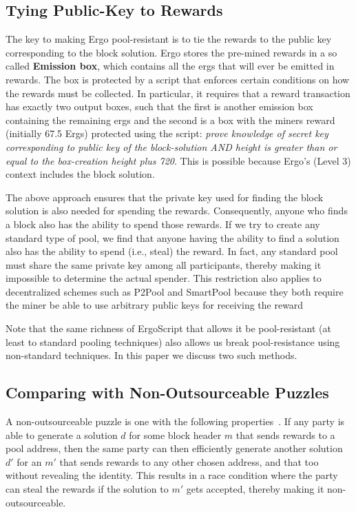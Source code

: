 \documentclass[11pt]{article}
\newcommand{\authnote}[2]{\marginpar{\parbox{\marginparwidth}{\tiny %
  \textsf{#1 {\textcolor{blue}{notes: #2}}}}}%
  \textcolor{blue}{\textbf{\dag}}}
\newcommand{\authnote}[2]{
  \textsf{#1 \textcolor{blue}{: #2}}}
\newcommand{\authnote}[2]{}
\newcommand{\snote}[1]{{\authnote{\textcolor{yellow}{Scalahub notes}}{#1}}}
\newcommand{\langname}{ErgoScript\xspace}
\newcommand{\powname}{Autolykos\xspace}
\begin{document}
\subsection{Tying Public-Key to Rewards}

The key to making Ergo pool-resistant is to tie the rewards to the public key corresponding to the block solution. 
Ergo stores the pre-mined rewards in a so called \textbf{Emission box}, which contains all the ergs that will ever be emitted in rewards. The box is protected by a script that enforces certain conditions on how the rewards must be collected. In particular, it requires that a reward transaction has exactly two output boxes, such that the first is another emission box containing the remaining ergs and the second is a box with the miners reward (initially 67.5 Ergs) protected using the script: {\em prove knowledge of secret key corresponding to public key of the block-solution AND height is greater than or equal to the box-creation height plus 720}.  
This is possible because Ergo's (Level 3) context includes the block solution.  

The above approach ensures that the private key used for finding the block solution is also needed for spending the rewards. Consequently, anyone who finds a block also has the ability to spend those rewards. 
If we try to create any standard type of pool, we find that anyone having the ability to find a solution also has the ability to spend (i.e., steal) the reward. In fact, any standard pool must share the same private key among all participants, thereby making it impossible to determine the actual spender. This restriction also applies to decentralized schemes such as P2Pool and SmartPool because they both require the miner be able to use arbitrary public keys for receiving the reward

Note that the same richness of \langname that allows it be pool-resistant (at least to standard pooling techniques) also allows us break pool-resistance using non-standard techniques. In this paper we discuss two such methods.  

\snote{Discuss how \powname fits (which) definition of non-outsourceable puzzles.}

\subsection{Comparing with Non-Outsourceable Puzzles}

A non-outsourceable puzzle is one with the following properties~\cite{miller2015nonoutsourceable}. If any party is able to generate a solution $d$ for some block header $m$ that sends rewards to a pool address, then the same party can then efficiently generate another solution $d'$ for an $m'$ that sends rewards to any other chosen address, and that too without revealing the identity. This results in a race condition where the party can steal the rewards if the solution to $m'$ gets accepted, thereby making it non-outsourceable. 
\end{document}
